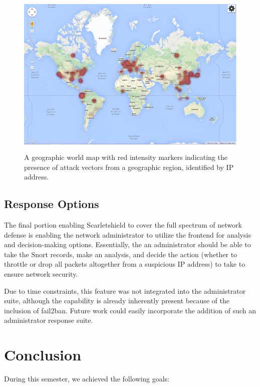 \documentclass[12pt,letterpaper,titlepage]{report}
\begin{document}
{\begin{figure}[h!]
\centering
  \includegraphics[height=8cm]{./heatmap.png}
  \caption{A geographic world map with red intensity markers indicating
  the presence of attack vectors from a geographic region, identified by IP address.}
\end{figure}

\section{Response Options}

The final portion enabling Scarletshield to cover the full spectrum of network
defense is enabling the network administrator to utilize the frontend for
analysis and decision-making options.  Essentially, the an administrator should
be able to take the Snort records, make an analysis, and decide the action
(whether to throttle or drop all packets altogether from a suspicious IP
address) to take to ensure network security.

Due to time constraints, this feature was not integrated into the administrator
suite, although the capability is already inherently present because of the
inclusion of fail2ban. Future work could easily incorporate the addition of such
an administrator response suite.

\chapter{Conclusion}

During this semester, we achieved the following goals:


}
\end{document}
